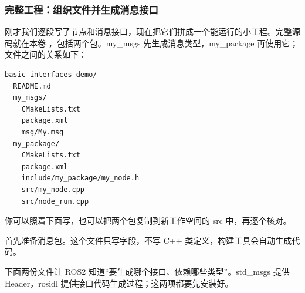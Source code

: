 \subsubsection{完整工程：组织文件并生成消息接口}
\label{sec:ros2-project}
刚才我们逐段写了节点和消息接口，现在把它们拼成一个能运行的小工程。完整源码就在本卷 ，包括两个包。my\_msgs 先生成消息类型，my\_package 再使用它；文件之间的关系如下：
\par\medskip\noindent\begin{minipage}{\linewidth}
\begin{lstlisting}[language={}]
basic-interfaces-demo/
  README.md
  my_msgs/
    CMakeLists.txt
    package.xml
    msg/My.msg
  my_package/
    CMakeLists.txt
    package.xml
    include/my_package/my_node.h
    src/my_node.cpp
    src/node_run.cpp
\end{lstlisting}
\end{minipage}\par\smallskip
你可以照着下面写，也可以把两个包复制到新工作空间的 src 中，再逐个核对。

\begin{example}[准备消息包与接口生成规则]
首先准备消息包。这个文件只写字段，不写 C++ 类定义，构建工具会自动生成代码。
\par\medskip\noindent\begin{minipage}{\linewidth}

\end{minipage}\par\smallskip

下面两份文件让 ROS2 知道“要生成哪个接口、依赖哪些类型”。std\_msgs 提供 Header，rosidl 提供接口代码生成过程；这两项都要先安装好。
\par\medskip\noindent\begin{minipage}{\linewidth}

\end{minipage}\par\smallskip
\par\medskip\noindent\begin{minipage}{\linewidth}

\end{minipage}\par\smallskip

\end{example}

